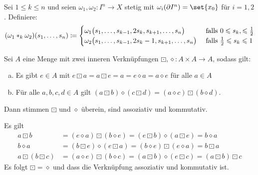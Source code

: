 \begin{definition}[{name=[Analogon zu Kompositionswegen]}]
	Sei $1 \le k \le n$ und seien  $\omega_1, \omega_2 \colon I^n \to X$ stetig mit $\omega_i(\partial I^n) = \set{x_0}$ für $i=1,2$. Definiere:
	\[
		\enbrace*{\omega_1 *_k \omega_2} (s_1, \ldots , s_n) \coloneqq \begin{cases}
			\omega_1 \enbrace[\big]{s_1, \ldots , s_{k-1}, 2 s_k, s_{k+1}, \ldots , s_n} &\text{ falls } 0 \le s_k, \le \frac{1}{2} \\
			\omega_2 \enbrace[\big]{s_1, \ldots , s_{k-1}, 2 s_k - 1, s_{k+1}, \ldots , s_n} &\text{ falls } \frac{1}{2} \le s_k \le 1 
		\end{cases} 
	\]
\end{definition}

\begin{lemma}[{name={Eckmann-Hilton-Argument}}]
	Sei $A$ eine Menge mit zwei inneren Verknüpfungen $\boxdot, \diamond \colon A \times A\to A $, sodass gilt:
	\begin{enumerate}[a)]
		\item Es gibt $e \in A$ mit $e \boxdot a = a \boxdot e = a = e \diamond a = a \diamond e$ für alle $a \in A$
		\item Für alle $a,b,c,d \in A$ gilt $(a \boxdot b) \diamond (c \boxdot d) = (a \diamond c) \boxdot (b \diamond d)$.
	\end{enumerate}
	Dann stimmen $\boxdot$ und $\diamond $ überein, sind assoziativ und kommutativ.
\end{lemma}
\begin{beweis}
	Es gilt
	\begin{align*}
		a \boxdot b &= (e \diamond a) \boxdot (b \diamond e) = (e \boxdot b) \diamond (a \boxdot e) = b \diamond a \\
		b \diamond a &= (b \boxdot e) \diamond (e \boxdot a) = (b \diamond e) \boxdot (e \diamond a) = b \boxdot a \\
		a \boxdot (b \boxdot c) &= (a \diamond e) \boxdot (b \diamond c) = (a \boxdot b) \diamond (e \boxdot c) = (a \boxdot b) \boxdot c
	\end{align*}
	Es folgt $\boxdot = \diamond$ und dass die Verknüpfung assoziativ und kommutativ ist.
\end{beweis}

